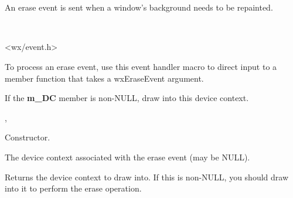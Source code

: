 \section{}\label{wxeraseevent}

An erase event is sent when a window's background needs to be repainted.


\\


<wx/event.h>


To process an erase event, use this event handler macro to direct input to a member
function that takes a wxEraseEvent argument.

\twocolwidtha{7cm}
\begin{twocollist}\itemsep=0pt
\end{twocollist}%


If the {\bf m\_DC} member is non-NULL, draw into this device context.


, 




Constructor.



The device context associated with the erase event (may be NULL).

\label{wxeraseeventgetdc}


Returns the device context to draw into. If this is non-NULL, you should draw
into it to perform the erase operation.

